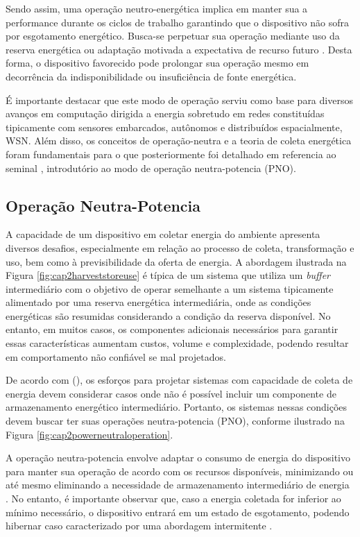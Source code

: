 Sendo assim, uma operação neutro-energética implica em manter sua a performance durante os ciclos de trabalho garantindo que o dispositivo não sofra por esgotamento energético. Busca-se perpetuar sua operação mediante uso da reserva energética ou adaptação motivada a expectativa de recurso futuro \cite{sudevalayam_energy_2011}. Desta forma, o dispositivo favorecido pode prolongar sua operação mesmo em decorrência da indisponibilidade ou insuficiência de fonte energética.

É importante destacar que este modo de operação serviu como base para diversos avanços em computação dirigida a energia sobretudo em redes constituídas tipicamente com sensores embarcados, autônomos e distribuídos espacialmente, \acf{WSN}. Além disso, os conceitos de operação-neutra e a teoria de coleta energética foram fundamentais para o que posteriormente foi detalhado em referencia ao seminal \cite{merrett_energy-driven_2017}, introdutório ao modo de operação neutra-potencia (\acl{PNO}).


\subsection{Operação Neutra-Potencia}
A capacidade de um dispositivo em coletar energia do ambiente apresenta diversos desafios, especialmente em relação ao processo de coleta, transformação e uso, bem como à previsibilidade da oferta de energia. A abordagem ilustrada na Figura \ref{fig:cap2harveststoreuse} é típica de um sistema que utiliza um \textit{buffer} intermediário com o objetivo de operar semelhante a um sistema tipicamente alimentado por uma reserva energética intermediária, onde as condições energéticas são resumidas considerando a condição da reserva disponível. No entanto, em muitos casos, os componentes adicionais necessários para garantir essas características aumentam custos, volume e complexidade, podendo resultar em comportamento não confiável se mal projetados.

De acordo com \citeauthor{merrett_energy-driven_2017}(\citeyear{merrett_energy-driven_2017}), os esforços para projetar sistemas com capacidade de coleta de energia devem considerar casos onde não é possível incluir um componente de armazenamento energético intermediário. Portanto, os sistemas nessas condições devem buscar ter suas operações neutra-potencia (\acl{PNO}), conforme ilustrado na Figura \ref{fig:cap2powerneutraloperation}.

A operação neutra-potencia envolve adaptar o consumo de energia do dispositivo para manter sua operação de acordo com os recursos disponíveis, minimizando ou até mesmo eliminando a necessidade de armazenamento intermediário de energia \cite{sliper_energy-driven_2020}. No entanto, é importante observar que, caso a energia coletada for inferior ao mínimo necessário, o dispositivo entrará em um estado de esgotamento, podendo hibernar caso caracterizado por uma abordagem intermitente \cite{merrett_energy-driven_2017}.

